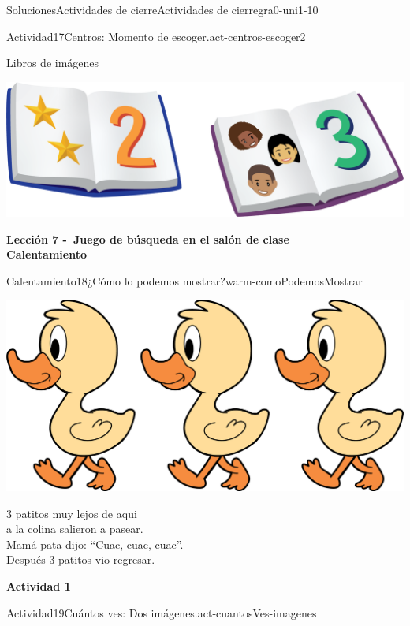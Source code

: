 \documentclass[twoside,10pt,]{article}
\begin{document}
\begin{solutions-section}{Soluciones}{Actividades de cierre}{}{Actividades de cierre}{}{}{gra0-uni1-10}
\begin{activitysolution}{Actividad}{17}{Centros: Momento de escoger.}{act-centros-escoger2}
\begin{sidebyside}{2}{0.025}{0.025}{0.05}
\begin{sbspanel}{0.45}%
Libros de imágenes%
\par
\includegraphics[width=\linewidth]{external/png-source/K.1.D Beta Student Workbooks.Books.png}
\end{sbspanel}%
\end{sidebyside}%
\end{activitysolution}%
\par\medskip
\noindent\textbf{\large{}\space\textperiodcentered\space{}Lección 7 -~Juego de búsqueda en el salón de clase\\
\space\textperiodcentered\space{}Calentamiento}
\begin{explorationsolution}{Calentamiento}{18}{¿Cómo lo podemos mostrar?}{warm-comoPodemosMostrar}%
\begin{image}{0.2}{0.6}{0.2}{}%
\includegraphics[width=\linewidth]{external/png-source/3 ducks.png}
\end{image}%
%
\par
3 patitos muy lejos de aqui\\
 a la colina salieron a pasear.\\
 Mamá pata dijo: “Cuac, cuac, cuac”.\\
 Después 3 patitos vio regresar.%
\end{explorationsolution}%
\par\medskip
\noindent\textbf{\large{}\space\textperiodcentered\space{}Actividad 1}
\begin{activitysolution}{Actividad}{19}{Cuántos ves: Dos imágenes.}{act-cuantosVes-imagenes}%

\end{activitysolution}
\end{solutions-section}
\end{document}
